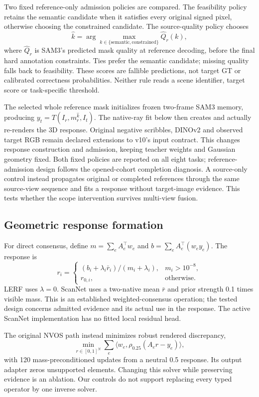 Two fixed reference-only admission policies are compared. The feasibility policy
retains the semantic candidate when it satisfies every original signed pixel,
otherwise choosing the constrained candidate. The source-quality policy chooses
\[
 \hat k=\arg\max_{k\in\{\mathrm{semantic},\mathrm{constrained}\}}
             \widehat Q_r(k),
\]
where $\widehat Q_r$ is SAM3's predicted mask quality at reference decoding,
before the final hard annotation constraints. Ties prefer the semantic candidate;
missing quality falls back to feasibility. These scores are fallible predictions,
not target GT or calibrated correctness probabilities. Neither rule reads a
scene identifier, target score or task-specific threshold.

The selected whole reference mask initializes frozen two-frame SAM3 memory,
producing $y_t=T(I_r,m_r^{\hat k},I_t)$. The native-ray fit below then
creates and actually re-renders the 3D response. Original negative scribbles,
DINOv2 and observed target RGB remain declared extensions to v10's input contract.
This changes response construction and admission, keeping teacher weights and
Gaussian geometry fixed. Both fixed policies are reported on all eight tasks;
reference-admission design follows the opened-cohort completion diagnosis.
A source-only control instead propagates original or completed references
through the same source-view sequence and fits a response without target-image
evidence. This tests whether the scope intervention survives multi-view fusion.

\subsection{Geometric response formation}
For direct consensus, define $m=\sum_e A_e^\top w_e$ and
$b=\sum_e A_e^\top(w_ey_e)$. The response is
\begin{equation}
 r_i=\begin{cases}
 (b_i+\lambda_i\bar r_i)/(m_i+\lambda_i),&m_i>10^{-8},\\
 r_{0,i},&\text{otherwise}.
 \end{cases}
 \label{eq:consensus}
\end{equation}
LERF uses $\lambda=0$. ScanNet uses a two-native mean $\bar r$ and prior strength
0.1 times visible mass. This is an established weighted-consensus operation;
the tested design concerns admitted evidence and its actual use in the response.
The active ScanNet implementation has no fitted local residual head.

The original NVOS path instead minimizes robust rendered discrepancy,
\begin{equation}
 \min_{r\in[0,1]^N}\sum_e\langle w_e,\rho_{0.25}(A_er-y_e)\rangle,
 \label{eq:reference}
\end{equation}
with 120 mass-preconditioned updates from a neutral 0.5 response. Its output
adapter zeros unsupported elements. Changing this solver while preserving
evidence is an ablation. Our controls do not support replacing every typed
operator by one inverse solver.

